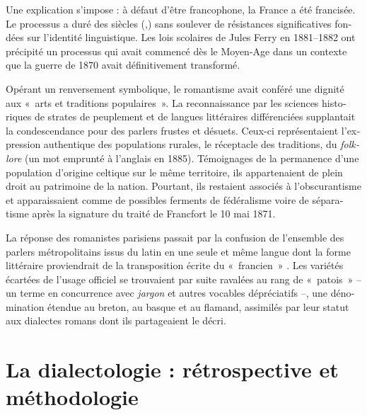 \documentclass[french,output=paper,colorlinks,citecolor=brown]{../langscibook}
\begin{document}
\begin{otherlanguage}{french}
Une explication s’impose : à défaut d’être francophone, la France a été francisée. Le processus a duré des siècles (\citealt{Brunot1905, BoyerGardy2001, KremnitzBroudic2013},) sans soulever de résistances significatives fondées sur l’identité linguistique. Les lois scolaires de Jules Ferry en 1881--1882 ont précipité un processus qui avait commencé dès le Moyen-Age dans un contexte que la guerre de 1870 avait définitivement transformé. 

Opérant un renversement symbolique, le romantisme avait conféré une dignité aux «~arts et traditions populaires~». La reconnaissance par les sciences historiques de strates de peuplement et de langues littéraires différenciées supplantait la condescendance pour des parlers frustes et désuets. Ceux-ci représentaient l’expression authentique des populations rurales, le réceptacle des traditions, du \textit{folklore} (un mot emprunté à l’anglais en 1885). Témoignages de la permanence d’une population d’origine celtique sur le même territoire, ils appartenaient de plein droit au patrimoine de la nation. Pourtant, ils restaient associés à l’obscurantisme et apparaissaient comme de possibles ferments de fédéralisme voire de séparatisme après la signature du traité de Francfort le 10 mai 1871. 

La réponse des romanistes parisiens passait par la confusion de l’ensemble des parlers métropolitains issus du latin en une seule et même langue dont la forme littéraire proviendrait de la transposition écrite du «~francien~» \citep{AurouxEtAl1996}. Les variétés écartées de l’usage officiel se trouvaient par suite ravalées au rang de «~patois~» – un terme en concurrence avec \textit{jargon} et autres vocables dépréciatifs –, une dénomination étendue au breton, au basque et au flamand, assimilés par leur statut aux dialectes romans dont ils partageaient le décri.

\section{La dialectologie : rétrospective et méthodologie}
 

\end{otherlanguage}
\end{document}
